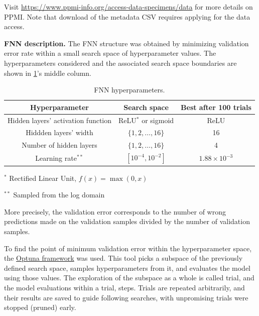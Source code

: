     Visit 
    \url{https://www.ppmi-info.org/access-data-specimens/data}
    for more details on PPMI.
    Note that download of the metadata CSV requires applying for the data access.


\newpage
\noindent\textbf{FNN description.}
The FNN structure was obtained by minimizing validation error rate within a small search space of hyperparameter values.
The hyperparameters considered and the associated search space boundaries are shown in \cref{tab:hparams_fnn}'s middle column.
%
\begin{table}[!h]
    \centering
    \begin{threeparttable}
    \caption{FNN hyperparameters.}
    \label{tab:hparams_fnn}
    \begin{tabular}{ccc}
        \toprule
            Hyperparameter & Search space & Best after 100 trials \\
        \midrule
            Hidden layers' activation function & ReLU$^*$ or sigmoid & ReLU \\
            Hiddden layers' width & $\{1, 2, \dots, 16\}$ & 16 \\
            Number of hidden layers & $\{1, 2, \dots, 16\}$ & 4 \\
            Learning rate$^{**}$ & $[10^{-4}, 10^{-2}]$ & $1.88 \times 10^{-3}$\\
        \bottomrule
    \end{tabular}
    \begin{tablenotes}
        \item $^*$ Rectified Linear Unit, $f(x) = \max(0, x)$ 
        \item $^{**}$ Sampled from the log domain
    \end{tablenotes}
\end{threeparttable}
\end{table}

More precisely, the validation error corresponds to 
the number of wrong predictions made on the validation samples divided by the number of validation samples.

To find the point of minimum validation error within the hyperparameter space, the \href{https://optuna.org/}{Optuna framework} was used.
This tool picks a subspace of the previously defined search space, samples hyperparameters from it, and evaluates the model using those values.
The exploration of the subspace as a whole is called trial, and the model evaluations within a trial, steps.  
Trials are repeated arbitrarily, and their results are saved to guide following searches, 
with unpromising trials were stopped (pruned) early.

